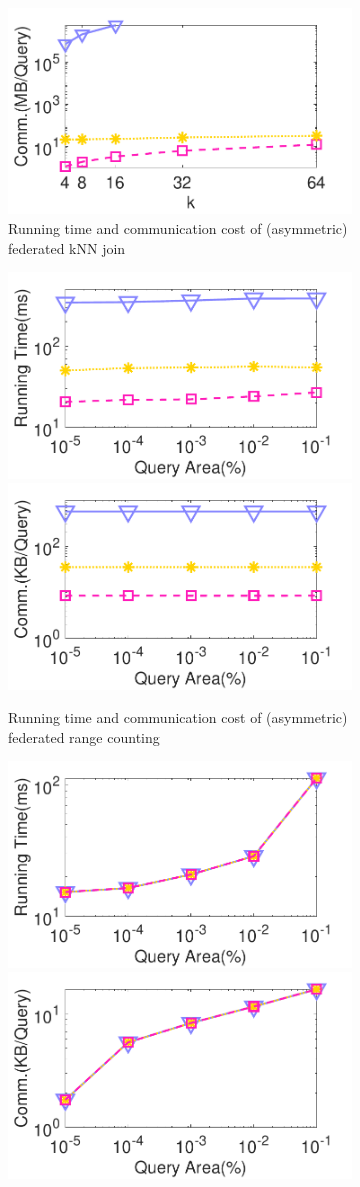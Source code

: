 \begin{figure}[t]
\begin{subfigure}{0.48\textwidth}
        \includegraphics[width=0.48\linewidth]{apdx/knnjoin_k_cost.pdf}
        \caption{Running time and communication cost of (asymmetric) federated kNN join}
        \label{fig:knn-j-eff-k-n-hon}
    \end{subfigure} 
     \begin{subfigure}{0.48\textwidth}
        \centering
        \includegraphics[width=0.48\linewidth]{apdx/rangecount_area_time.pdf}
        \includegraphics[width=0.48\linewidth]{apdx/rangecount_area_cost.pdf}
        \caption{Running time and communication cost of (asymmetric) federated range counting}
        \label{fig:count-eff-r-n-hon}
    \end{subfigure}
     \begin{subfigure}{0.48\textwidth}
        \centering
        \includegraphics[width=0.48\linewidth]{apdx/rangequery_area_time.pdf}
        \includegraphics[width=0.48\linewidth]{apdx/rangequery_area_cost.pdf}

\end{subfigure}
\end{figure}
